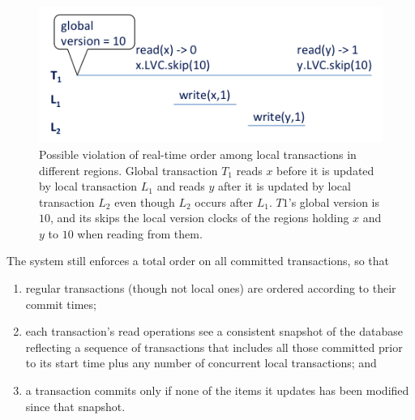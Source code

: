 \begin{figure}[h]
\includegraphics[width=\columnwidth]{LTX-RT}
\caption{Possible violation of real-time order among local transactions in different regions. Global transaction $T_1$
reads $x$ before it is updated by local transaction $L_1$ and reads $y$ after it is updated by local transaction $L_2$ even 
though $L_2$ occurs after $L_1$. $T1$'s global version is $10$, and its skips the local version clocks of the regions holding $x$ and $y$ to $10$ when reading from them.}
\label{fig:ltx-rt}
\end{figure}

The system still enforces a total order on all committed transactions, so that
\begin{enumerate}
    \setlength{\itemsep}{0pt}
    \setlength{\parskip}{0pt}
    \setlength{\parsep}{2pt}  
\item
regular transactions (though not local ones) are ordered according to their commit times;
\item
each transaction's read operations see a consistent snapshot of the database reflecting 
a sequence of transactions that includes all those committed prior to
its start time plus any number of concurrent local transactions; and 
\item
 a transaction commits only if none of the items it updates has been modified since that snapshot.
 \end{enumerate}

